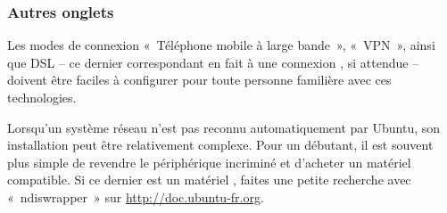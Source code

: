 {\subsubsection{Autres onglets}
Les modes de connexion «~Téléphone mobile à large bande~», «~VPN~», ainsi que DSL -- ce dernier correspondant en fait à une connexion , si attendue -- doivent être faciles à configurer pour toute personne familière avec ces technologies.
\begin{nota}
\label{RefNoteDongleWifi}
Lorsqu'un système réseau n'est pas reconnu automatiquement par Ubuntu, son installation peut être relativement complexe. Pour un débutant, il est souvent plus simple de revendre le périphérique incriminé et d'acheter un matériel compatible. Si ce dernier est un matériel , faites une petite recherche avec «~ndiswrapper~» sur \url{http://doc.ubuntu-fr.org}.
\end{nota}
}
